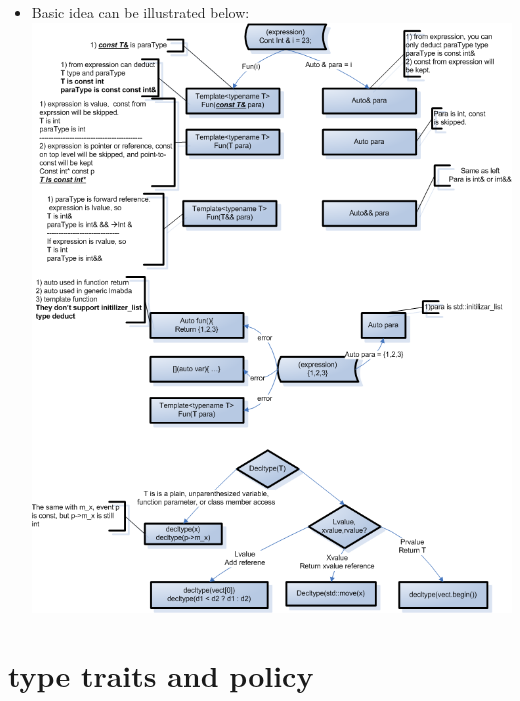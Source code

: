 \documentclass[a4paper,12pt,twoside]{book}
\begin{document}
\begin{itemize}
	\item Basic idea can be illustrated below:
	\includegraphics[scale=0.8]{pics/type_deduct.png}
\end{itemize}

\section{type traits and policy}
\end{document}

